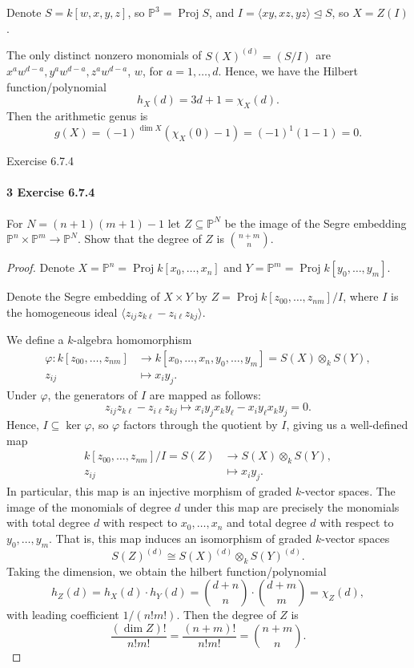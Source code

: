 \documentclass[12pt]{article}
\newlength{\myparskip}
\newenvironment{fullbox}{\begin{lrbox}{\savefullbox}\begin{minipage}{\dimexpr\textwidth-2\fboxsep\relax}\setlength{\parskip}{\myparskip}}{\end{minipage}\end{lrbox}\framebox[\textwidth]{\usebox{\savefullbox}}}
\newenvironment{pbox}[1][]{\begin{fullbox}\ifx#1\empty\else\paragraph{#1}\phantom{}\fi}{\end{fullbox}}
\theoremstyle{definition}
\renewcommand{\P}{\mathbb{P}}
\renewcommand{\phi}{\varphi}
\newcommand{\<}{\langle}
\renewcommand{\>}{\rangle}
\newcommand{\isom}{\cong}
\newcommand{\seq}{\subseteq}
\newcommand{\teq}{\trianglelefteq}
\newcommand{\tensor}{\otimes}
\DeclareMathOperator{\Proj}{Proj}
\begin{document}
Denote $S = k[w, x, y, z]$, so $\P^3 = \Proj S$, and $I = \<xy, xz, yz\> \teq S$, so $X = Z(I)$.

The only distinct nonzero monomials of $S(X)^{(d)} = (S/I)^{}$ are $x^aw^{d-a}, y^aw^{d-a}, z^aw^{d-a}$, $w$, for $a = 1, \dots, d$.
Hence, we have the Hilbert function/polynomial
\[
    h_X(d) = 3d + 1 = \chi_X(d).
\]
Then the arithmetic genus is
\[
    g(X)
        = (-1)^{\dim X}(\chi_X(0) - 1)
        = (-1)^1(1 - 1)
        = 0.
\]








\newpage
\begin{pbox}[3 Exercise 6.7.4]
    For $N = (n + 1)(m + 1) - 1$ let $Z \seq \P^N$ be the image of the Segre embedding $\P^n \times \P^m \to \P^N$.
    Show that the degree of $Z$ is $\binom{n + m}{n}$.
\end{pbox}

\begin{proof}
    Denote $X = \P^n = \Proj k[x_0, \dots, x_n]$ and $Y = \P^m = \Proj k[y_0, \dots, y_m]$.

    Denote the Segre embedding of $X \times Y$ by $Z = \Proj k[z_{00}, \dots, z_{nm}]/I$, where $I$ is the homogeneous ideal $\<z_{ij}z_{k\ell} - z_{i\ell}z_{kj}\>$.

    We define a $k$-algebra homomorphism
    \begin{align*}
        \phi : k[z_{00}, \dots, z_{nm}] &\longrightarrow k[x_0, \dots, x_n, y_0, \dots, y_m] =  S(X) \tensor_k S(Y), \\
            z_{ij} &\longmapsto x_iy_j.
    \end{align*}
    Under $\phi$, the generators of $I$ are mapped as follows:
    \[
        z_{ij}z_{k\ell} - z_{i\ell}z_{kj}
            \longmapsto x_iy_jx_ky_\ell - x_iy_\ell x_ky_j
            = 0.
    \]
    Hence, $I \seq \ker\phi$, so $\phi$ factors through the quotient by $I$, giving us a well-defined map
    \begin{align*}
        k[z_{00}, \dots, z_{nm}]/I = S(Z) &\longrightarrow S(X) \tensor_k S(Y), \\
            z_{ij} &\longmapsto x_iy_j.
    \end{align*}
    In particular, this map is an injective morphism of graded $k$-vector spaces.
    The image of the monomials of degree $d$ under this map are precisely the monomials with total degree $d$ with respect to $x_0, \dots, x_n$ and total degree $d$ with respect to $y_0, \dots, y_m$.
    That is, this map induces an isomorphism of graded $k$-vector spaces
    \[
        S(Z)^{(d)} \isom S(X)^{(d)} \tensor_k S(Y)^{(d)}.
    \]
    Taking the dimension, we obtain the hilbert function/polynomial
    \[
        h_Z(d) = h_X(d) \cdot h_Y(d) = \binom{d + n}{n} \cdot \binom{d + m}{m} = \chi_Z(d),
    \]
    with leading coefficient $1/(n!m!)$.
    Then the degree of $Z$ is
    \[
        \frac{(\dim Z)!}{n!m!} = \frac{(n + m)!}{n!m!} = \binom{n + m}{n}.
    \]
\end{proof}
\end{document}
